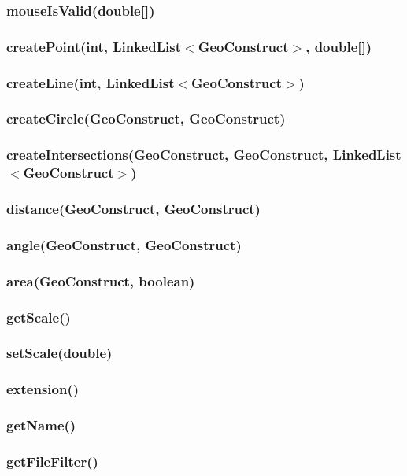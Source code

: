 \documentclass[a4paper,10pt]{report}
\begin{document}
\subsubsection{mouseIsValid(double[])} 
\subsubsection{createPoint(int, LinkedList$<$GeoConstruct$>$, double[])} 
\subsubsection{createLine(int, LinkedList$<$GeoConstruct$>$)} 
\subsubsection{createCircle(GeoConstruct, GeoConstruct)} 
\subsubsection{createIntersections(GeoConstruct, GeoConstruct, LinkedList$<$GeoConstruct$>$)} 
\subsubsection{distance(GeoConstruct, GeoConstruct)} 
\subsubsection{angle(GeoConstruct, GeoConstruct)} 
\subsubsection{area(GeoConstruct, boolean)} 
\subsubsection{getScale()} 
\subsubsection{setScale(double)} 
\subsubsection{extension()} 
\subsubsection{getName()}  
\subsubsection{getFileFilter()} 
\end{document}
